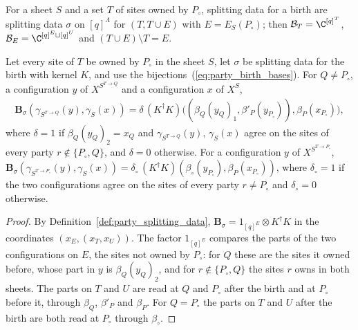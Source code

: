For a sheet $S$ and a set $T$ of sites owned by $P_\circ$, splitting data for a birth are
splitting data $\sigma$ on $[q]^\Lambda$ for $(T,T\cup E)$ with $E=E_S(P_\circ)$; then
$\mathcal B_T=\C^{[q]^T}$, $\mathcal B_E=\C^{[q]^E\sqcup[q]^U}$ and $(T\cup E)\setminus T=E$.

\begin{theorem}
    \label{thm:party_config_birth_op}
    \leanok
    Let every site of $T$ be owned by $P_\circ$ in the sheet $S$, let $\sigma$ be splitting data
    for the birth with kernel $K$, and use the bijections~(\ref{eq:party_birth_bases}). For
    $Q\neq P_\circ$, a configuration $y$ of $X^{S^{T\to Q}}$ and a configuration $x$ of $X^S$,
    \begin{align}
        \mathbf B_\sigma(\gamma_{S^{T\to Q}}(y),\gamma_S(x))
        =\delta\,(K^\dagger K)\bigl((\beta_Q(y_Q)_1,\beta'_P(y_{P_\circ})),
        \beta_P(x_{P_\circ})\bigr),
        \label{eq:party_birth_entry}
    \end{align}
    where $\delta=1$ if $\beta_Q(y_Q)_2=x_Q$ and $\gamma_{S^{T\to Q}}(y)$, $\gamma_S(x)$ agree on
    the sites of every party $r\notin\{P_\circ,Q\}$, and $\delta=0$ otherwise. For a configuration
    $y$ of $X^{S^{T\to P_\circ}}$,
    $\mathbf B_\sigma(\gamma_{S^{T\to P_\circ}}(y),\gamma_S(x))
        =\delta_\circ\,(K^\dagger K)(\beta_\circ(y_{P_\circ}),\beta_P(x_{P_\circ}))$, where
    $\delta_\circ=1$ if the two configurations agree on the sites of every party $r\neq P_\circ$
    and $\delta_\circ=0$ otherwise.
\end{theorem}
\begin{proof}\leanok
    By Definition~\ref{def:party_splitting_data},
    $\mathbf B_\sigma=1_{[q]^E}\otimes K^\dagger K$ in the coordinates $(x_E,(x_T,x_U))$. The
    factor $1_{[q]^E}$ compares the parts of the two configurations on $E$, the sites not owned
    by $P_\circ$: for $Q$ these are the sites it owned before, whose part in $y$ is
    $\beta_Q(y_Q)_2$, and for $r\notin\{P_\circ,Q\}$ the sites $r$ owns in both sheets. The parts
    on $T$ and $U$ are read at $Q$ and $P_\circ$ after the birth and at $P_\circ$ before it,
    through $\beta_Q$, $\beta'_P$ and $\beta_P$. For $Q=P_\circ$ the parts on $T$ and $U$ after
    the birth are both read at $P_\circ$ through $\beta_\circ$.
\end{proof}

